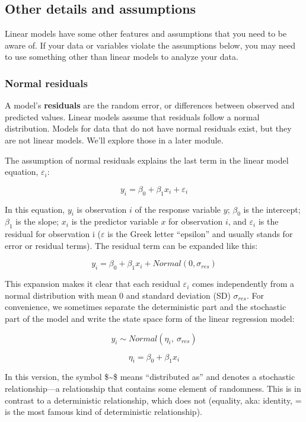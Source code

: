 \documentclass[
  13,
  letterpaper,
]{report}
\begin{document}
\subsection{Other details and
assumptions}\label{other-details-and-assumptions}

Linear models have some other features and assumptions that you need to
be aware of. If your data or variables violate the assumptions below,
you may need to use something other than linear models to analyze your
data.

\subsubsection{Normal residuals}\label{normal-residuals}

A model's \textbf{residuals} are the random error, or differences
between observed and predicted values. Linear models assume that
residuals follow a normal distribution. Models for data that do not have
normal residuals exist, but they are not linear models. We'll explore
those in a later module.

The assumption of normal residuals explains the last term in the linear
model equation, \(\varepsilon_i\):

\[y_i=\beta_0+\beta_1x_i+\varepsilon_i\]

In this equation, \(y_i\) is observation \(i\) of the response variable
\(y\); \(\beta_0\) is the intercept; \(\beta_1\) is the slope; \(x_i\)
is the predictor variable \(x\) for observation \(i\), and
\(\varepsilon_i\) is the residual for observation i (\(\varepsilon\) is
the Greek letter ``epsilon'' and usually stands for error or residual
terms). The residual term can be expanded like this:

\[y_i=\beta_0+\beta_1x_i+Normal\left(0,\sigma_{res}\right)\]

This expansion makes it clear that each residual \(\varepsilon_i\) comes
independently from a normal distribution with mean 0 and standard
deviation (SD) \(\sigma_{res}\). For convenience, we sometimes separate
the deterministic part and the stochastic part of the model and write
the state space form of the linear regression model:

\[y_i\sim Normal\left(\eta_i,\ \sigma_{res}\right)\]

\[\eta_i=\beta_0+\beta_1x_i\]

In this version, the symbol \$\sim \$ means ``distributed as'' and
denotes a stochastic relationship---a relationship that contains some
element of randomness. This is in contrast to a deterministic
relationship, which does not (equality, aka: identity, = is the most
famous kind of deterministic relationship).
\end{document}
